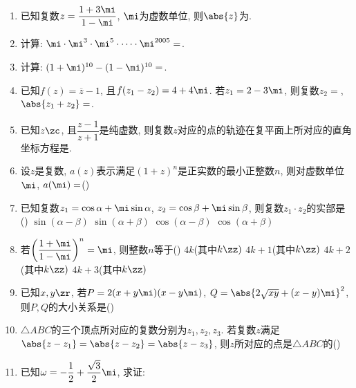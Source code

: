 \begin{enumerate}
    \item 已知复数$z=\dfrac{1+3\mi}{1-\mi}$, $\mi$为虚数单位, 则$\abs{z}$为. 


\item 计算: $\mi\cdot \mi^3\cdot \mi^5\cdot \cdots \cdot \mi^{2005}=$\blkda{$\mi$}. 


\item 计算: $(1+\mi)^{10}-(1-\mi)^{10}=$\blkda{$64\mi$}. 


\item 已知$f(z)=\overline{z}-1$, 且$f(z_1-z_2)=4+4\mi$. 若$z_1=2-3\mi$, 则复数$z_2=$, $\abs{z_1+z_2}=$. 


\item 已知$z\zc$, 且$\dfrac{z-1}{z+1}$是纯虚数, 则复数$z$对应的点的轨迹在复平面上所对应的直角坐标方程是. 


\item 设$z$是复数, $a(z)$表示满足$(1+z)^n$是正实数的最小正整数$n$, 则对虚数单位$\mi$, $a(\mi)=$\dotfill()


\item 已知复数$z_1=\cos\alpha+\mi\sin\alpha$, $z_2=\cos\beta+\mi\sin\beta$, 则复数$z_{1}\cdot z_{2}$的实部是\dotfill()
\xx
{$\sin(\alpha-\beta)$}
{$\sin(\alpha+\beta)$}
{$\cos(\alpha-\beta)$}
{$\cos(\alpha+\beta)$}


\item 若$\left(\dfrac{1+\mi}{1-\mi}\right)^n=\mi$, 则整数$n$等于\dotfill()
\xx
{$4k$(其中$k\zz)$}
{$4k+1$(其中$k\zz)$}
{$4k+2$(其中$k\zz)$}
{$4k+3$(其中$k\zz)$}


\item 已知$x,y\zr$, 若$P=2(x+y\mi)(x-y\mi)$, $Q=\abs{2\sqrt{xy}+(x-y)\mi}^2$, 则$P,Q$的大小关系是\dotfill()


\item $\triangle{ABC}$的三个顶点所对应的复数分别为$z_1,z_2,z_3$. 若复数$z$满足$\abs{z-z_1}=\abs{z-z_2}=\abs{z-z_3}$, 则$z$所对应的点是$\triangle{ABC}$的\dotfill()

\item 已知$\omega=-\dfrac{1}{2}+\dfrac{\sqrt{3}}{2}\mi$, 求证: 




\end{enumerate}
